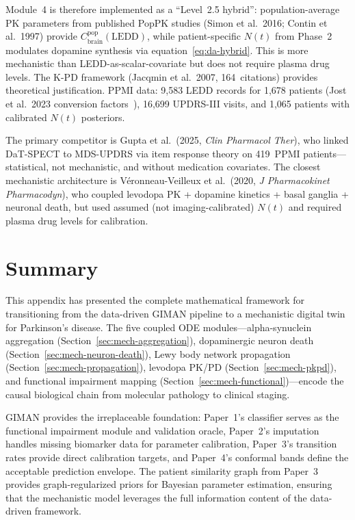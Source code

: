 Module~4 is therefore implemented as a ``Level~2.5 hybrid'': population-average PK parameters from published PopPK studies (Simon et al.\ 2016; Contin et al.\ 1997) provide $C_\text{brain}^\text{pop}(\text{LEDD})$, while patient-specific $N(t)$ from Phase~2 modulates dopamine synthesis via equation~\eqref{eq:da-hybrid}. This is more mechanistic than LEDD-as-scalar-covariate but does not require plasma drug levels. The K-PD framework (Jacqmin et al.\ 2007, 164~citations) provides theoretical justification. PPMI data: 9,583 LEDD records for 1,678 patients (Jost et al.\ 2023 conversion factors~\cite{jost2023}), 16,699 UPDRS-III visits, and 1,065 patients with calibrated $N(t)$ posteriors.

The primary competitor is Gupta et al.\ (2025, \emph{Clin Pharmacol Ther}), who linked DaT-SPECT to MDS-UPDRS via item response theory on 419~PPMI patients---statistical, not mechanistic, and without medication covariates. The closest mechanistic architecture is V\'{e}ronneau-Veilleux et al.\ (2020, \emph{J Pharmacokinet Pharmacodyn}), who coupled levodopa PK + dopamine kinetics + basal ganglia + neuronal death, but used assumed (not imaging-calibrated) $N(t)$ and required plasma drug levels for calibration.


\section{Summary}
\label{sec:mech-summary}

This appendix has presented the complete mathematical framework for transitioning from the data-driven GIMAN pipeline to a mechanistic digital twin for Parkinson's disease. The five coupled ODE modules---alpha-synuclein aggregation (Section~\ref{sec:mech-aggregation}), dopaminergic neuron death (Section~\ref{sec:mech-neuron-death}), Lewy body network propagation (Section~\ref{sec:mech-propagation}), levodopa PK/PD (Section~\ref{sec:mech-pkpd}), and functional impairment mapping (Section~\ref{sec:mech-functional})---encode the causal biological chain from molecular pathology to clinical staging.

GIMAN provides the irreplaceable foundation: Paper~1's classifier serves as the functional impairment module and validation oracle, Paper~2's imputation handles missing biomarker data for parameter calibration, Paper~3's transition rates provide direct calibration targets, and Paper~4's conformal bands define the acceptable prediction envelope. The patient similarity graph from Paper~3 provides graph-regularized priors for Bayesian parameter estimation, ensuring that the mechanistic model leverages the full information content of the data-driven framework.

